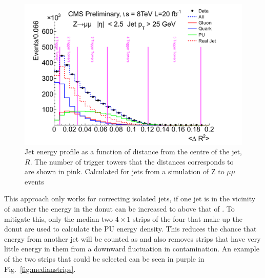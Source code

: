 \begin{figure}
	\begin{center}
		\includegraphics[width=0.8\linewidth]{figs/trigger/jetProfile}
  \caption{ Jet energy profile as a function of distance from the
  centre of the jet, $R$. The number of trigger towers that the
  distances corresponds to are shown in pink. Calculated for jets from
  a simulation of Z to $\mu\mu$ events \cite{JetProfile_pileup}}
	\label{fig:jetprofile}
	\end{center}
\end{figure}

This approach only works for correcting isolated jets, if one jet is
in the vicinity of another the energy in the donut can be increased to
above that of \PU. To mitigate this, only the median two $4\times1$
\TT strips of the four that make up the donut are used to calculate
the PU energy density. This reduces the chance that energy from
another jet will be counted as \PU and also removes strips that have
very little energy in them from a downward fluctuation in \PU
contamination. An example of the two strips that could be selected can
be seen in purple in Fig.~\ref{fig:medianstrips}.

